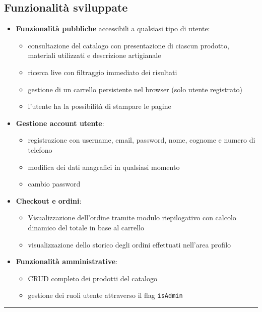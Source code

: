 \documentclass[11pt,a4paper]{article}
\newcommand{\sectionrule}{\vspace{0.5em}\noindent\rule{\linewidth}{0.4pt}\vspace{0.5em}}
\begin{document}
\subsection{Funzionalit\`a sviluppate}
\begin{itemize}
  \item \textbf{Funzionalit\`a pubbliche} accessibili a qualsiasi tipo di utente:
  \begin{itemize}
    \item consultazione del catalogo con presentazione di ciascun prodotto, materiali utilizzati e descrizione artigianale
    \item ricerca live con filtraggio immediato dei risultati
    \item gestione di un carrello persistente nel browser (solo utente registrato)
    \item l'utente ha la possibilità di stampare le pagine
  \end{itemize}
  \item \textbf{Gestione account utente}:
  \begin{itemize}
    \item registrazione con username, email, password, nome, cognome e numero di telefono
    \item modifica dei dati anagrafici in qualsiasi momento
    \item cambio password
  \end{itemize}
  \item \textbf{Checkout e ordini}:
  \begin{itemize}
    \item Visualizzazione dell'ordine tramite modulo riepilogativo con calcolo dinamico del totale in base al carrello
    \item visualizzazione dello storico degli ordini effettuati nell'area profilo
  \end{itemize}
  \item \textbf{Funzionalit\`a amministrative}:
  \begin{itemize}
    \item CRUD completo dei prodotti del catalogo
    \item gestione dei ruoli utente attraverso il flag \texttt{isAdmin}
  \end{itemize}
\end{itemize}

\sectionrule

\end{document}
